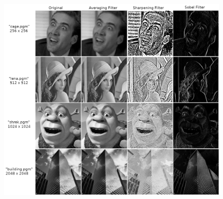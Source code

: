 \documentclass[10pt]{article}
\begin{document}
\begin{figure}[H]
\centering
\includegraphics[scale=1.2]{images.png}
\end{figure}
\end{document}
